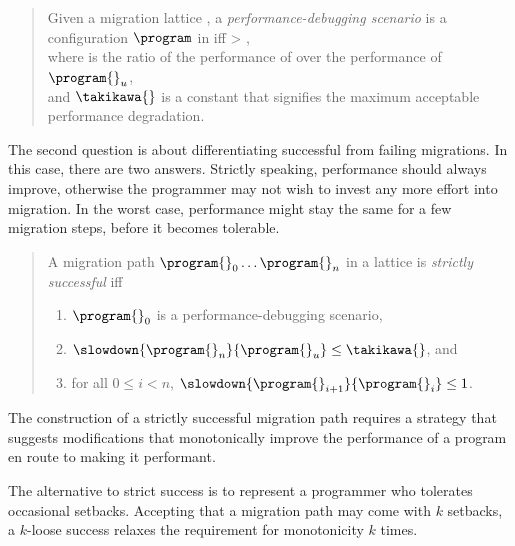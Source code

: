 \begin{quote} \em

Given a migration lattice ,
a \emph{performance-debugging scenario} is a configuration $\program$ in  
iff
 > \takikawa{},\\
 where  is the ratio of the performance of \program{} over the performance of $\program{}_u$,\\ 
 and $\takikawa{}$ is a constant that signifies the maximum acceptable performance degradation.
\end{quote}

The second question is about differentiating successful from failing migrations.
In this case, there are two answers. Strictly speaking, performance should
always improve, otherwise the programmer may not wish to invest any more effort
into migration.  In the worst case, performance might stay the same for a few
migration steps, before it becomes tolerable.

\begin{quote} \em

A migration path ${\program{}_0} \ldots {\program{}_n}$ in a lattice 
is \emph{strictly successful}
iff
\begin{enumerate}
  \item $\program{}_0$ is a performance-debugging scenario,
  \item $\slowdown{\program{}_n}{\program{}_u} \leq \takikawa{}$, and 
  \item for all $0 \leq i < n$, $\slowdown{\program{}_{i+1}}{\program{}_{i}} \leq 1$.
 \end{enumerate} 
\end{quote}
The construction of a strictly successful migration path requires a strategy
that suggests modifications that monotonically improve the performance of  a
program en route to making it performant.

The alternative to strict success is to represent a programmer who tolerates
occasional setbacks. Accepting that a migration path may come with $k$ setbacks,
a $k$-loose success relaxes the requirement for monotonicity $k$ times.

